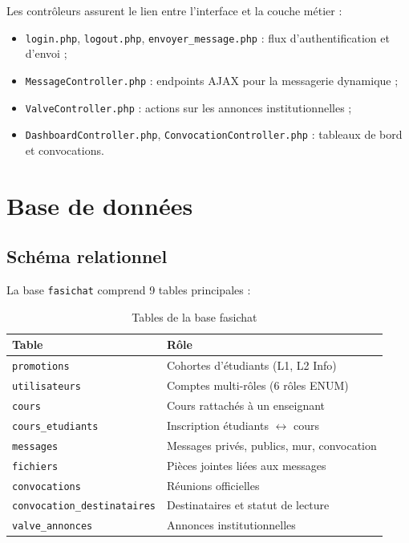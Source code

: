 \documentclass[12pt,a4paper]{article}
\begin{document}
Les contrôleurs assurent le lien entre l'interface et la couche métier :
\begin{itemize}
  \item \texttt{login.php}, \texttt{logout.php}, \texttt{envoyer\_message.php} : flux d'authentification et d'envoi ;
  \item \texttt{MessageController.php} : endpoints AJAX pour la messagerie dynamique ;
  \item \texttt{ValveController.php} : actions sur les annonces institutionnelles ;
  \item \texttt{DashboardController.php}, \texttt{ConvocationController.php} : tableaux de bord et convocations.
\end{itemize}

\section{Base de données}

\subsection{Schéma relationnel}

La base \texttt{fasichat} comprend 9 tables principales :

\begin{table}[h]
\centering
\small
\begin{tabular}{|l|l|}
\hline
\textbf{Table} & \textbf{Rôle} \\
\hline
\texttt{promotions} & Cohortes d'étudiants (L1, L2 Info) \\
\hline
\texttt{utilisateurs} & Comptes multi-rôles (6 rôles ENUM) \\
\hline
\texttt{cours} & Cours rattachés à un enseignant \\
\hline
\texttt{cours\_etudiants} & Inscription étudiants $\leftrightarrow$ cours \\
\hline
\texttt{messages} & Messages privés, publics, mur, convocation \\
\hline
\texttt{fichiers} & Pièces jointes liées aux messages \\
\hline
\texttt{convocations} & Réunions officielles \\
\hline
\texttt{convocation\_destinataires} & Destinataires et statut de lecture \\
\hline
\texttt{valve\_annonces} & Annonces institutionnelles \\
\hline
\end{tabular}
\caption{Tables de la base fasichat}
\end{table}
\end{document}
